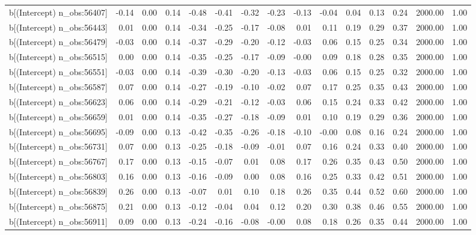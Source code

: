 \begin{table}[ht]
\begin{tabular}{rrrrrrrrrrrrrrr}
  b[(Intercept) n\_obs:56407] & -0.14 & 0.00 & 0.14 & -0.48 & -0.41 & -0.32 & -0.23 & -0.13 & -0.04 & 0.04 & 0.13 & 0.24 & 2000.00 & 1.00 \\ 
  b[(Intercept) n\_obs:56443] & 0.01 & 0.00 & 0.14 & -0.34 & -0.25 & -0.17 & -0.08 & 0.01 & 0.11 & 0.19 & 0.29 & 0.37 & 2000.00 & 1.00 \\ 
  b[(Intercept) n\_obs:56479] & -0.03 & 0.00 & 0.14 & -0.37 & -0.29 & -0.20 & -0.12 & -0.03 & 0.06 & 0.15 & 0.25 & 0.34 & 2000.00 & 1.00 \\ 
  b[(Intercept) n\_obs:56515] & 0.00 & 0.00 & 0.14 & -0.35 & -0.25 & -0.17 & -0.09 & -0.00 & 0.09 & 0.18 & 0.28 & 0.35 & 2000.00 & 1.00 \\ 
  b[(Intercept) n\_obs:56551] & -0.03 & 0.00 & 0.14 & -0.39 & -0.30 & -0.20 & -0.13 & -0.03 & 0.06 & 0.15 & 0.25 & 0.32 & 2000.00 & 1.00 \\ 
  b[(Intercept) n\_obs:56587] & 0.07 & 0.00 & 0.14 & -0.27 & -0.19 & -0.10 & -0.02 & 0.07 & 0.17 & 0.25 & 0.35 & 0.43 & 2000.00 & 1.00 \\ 
  b[(Intercept) n\_obs:56623] & 0.06 & 0.00 & 0.14 & -0.29 & -0.21 & -0.12 & -0.03 & 0.06 & 0.15 & 0.24 & 0.33 & 0.42 & 2000.00 & 1.00 \\ 
  b[(Intercept) n\_obs:56659] & 0.01 & 0.00 & 0.14 & -0.35 & -0.27 & -0.18 & -0.09 & 0.01 & 0.10 & 0.19 & 0.29 & 0.36 & 2000.00 & 1.00 \\ 
  b[(Intercept) n\_obs:56695] & -0.09 & 0.00 & 0.13 & -0.42 & -0.35 & -0.26 & -0.18 & -0.10 & -0.00 & 0.08 & 0.16 & 0.24 & 2000.00 & 1.00 \\ 
  b[(Intercept) n\_obs:56731] & 0.07 & 0.00 & 0.13 & -0.25 & -0.18 & -0.09 & -0.01 & 0.07 & 0.16 & 0.24 & 0.33 & 0.40 & 2000.00 & 1.00 \\ 
  b[(Intercept) n\_obs:56767] & 0.17 & 0.00 & 0.13 & -0.15 & -0.07 & 0.01 & 0.08 & 0.17 & 0.26 & 0.35 & 0.43 & 0.50 & 2000.00 & 1.00 \\ 
  b[(Intercept) n\_obs:56803] & 0.16 & 0.00 & 0.13 & -0.16 & -0.09 & 0.00 & 0.08 & 0.16 & 0.25 & 0.33 & 0.42 & 0.51 & 2000.00 & 1.00 \\ 
  b[(Intercept) n\_obs:56839] & 0.26 & 0.00 & 0.13 & -0.07 & 0.01 & 0.10 & 0.18 & 0.26 & 0.35 & 0.44 & 0.52 & 0.60 & 2000.00 & 1.00 \\ 
  b[(Intercept) n\_obs:56875] & 0.21 & 0.00 & 0.13 & -0.12 & -0.04 & 0.04 & 0.12 & 0.20 & 0.30 & 0.38 & 0.46 & 0.55 & 2000.00 & 1.00 \\ 
  b[(Intercept) n\_obs:56911] & 0.09 & 0.00 & 0.13 & -0.24 & -0.16 & -0.08 & -0.00 & 0.08 & 0.18 & 0.26 & 0.35 & 0.44 & 2000.00 & 1.00 \\ 

\end{tabular}
\end{table}
